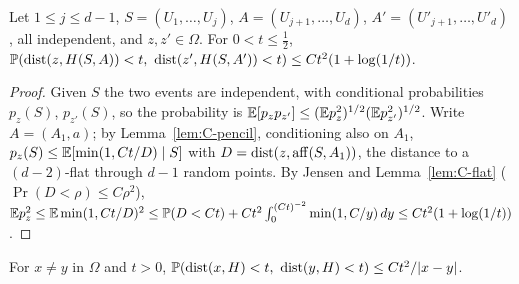 \begin{lemma}\label{lem:C-share}
Let $1 \le j \le d - 1$, $S = (U_1, \dots, U_j)$, $A = (U_{j+1}, \dots, U_d)$, $A' = (U'_{j+1}, \dots, U'_d)$, all
independent, and $z, z' \in \Omega$. For $0 < t \le \frac12$,
$\mathbb{P}(\operatorname{dist}(z, H(S, A)) < t,\ \operatorname{dist}(z', H(S, A')) < t) \le Ct^2(1 + \log(1/t))$.
\end{lemma}

\begin{proof}
Given $S$ the two events are independent, with conditional probabilities $p_z(S)$, $p_{z'}(S)$, so the probability is
$\mathbb{E}[p_zp_{z'}] \le (\mathbb{E} p_z^2)^{1/2}(\mathbb{E} p_{z'}^2)^{1/2}$. Write $A = (A_1, a)$; by Lemma~\ref{lem:C-pencil}, conditioning
also on $A_1$, $p_z(S) \le \mathbb{E}[\min(1, Ct/D) \mid S]$ with $D = \operatorname{dist}(z, \operatorname{aff}(S, A_1))$, the distance to a
$(d-2)$-flat through $d - 1$ random points. By Jensen and Lemma~\ref{lem:C-flat} ($\Pr(D < \rho) \le C\rho^2$),
$\mathbb{E} p_z^2 \le \mathbb{E}\min(1, Ct/D)^2 \le \mathbb{P}(D < Ct) + Ct^2\int_0^{(Ct)^{-2}}\min(1, C/y)\,dy \le Ct^2(1 + \log(1/t))$.
\end{proof}

\begin{lemma}\label{lem:C-two}
For $x \ne y$ in $\Omega$ and $t > 0$, $\mathbb{P}(\operatorname{dist}(x, H) < t,\ \operatorname{dist}(y, H) < t) \le Ct^2/|x - y|$.
\end{lemma}

